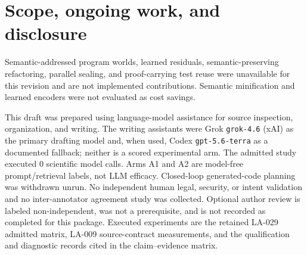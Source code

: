 \documentclass{article}
\begin{document}
\section{Scope, ongoing work, and disclosure}

Semantic-addressed program worlds, learned residuals, semantic-preserving refactoring, parallel sealing, and proof-carrying test reuse were unavailable for this revision and are not implemented contributions. Semantic minification and learned encoders were not evaluated as cost savings.

This draft was prepared using language-model assistance for source inspection, organization, and writing. The writing assistants were Grok \texttt{grok-4.6} (xAI) as the primary drafting model and, when used, Codex \texttt{gpt-5.6-terra} as a documented fallback; neither is a scored experimental arm. The admitted study executed $0$ scientific model calls. Arms A1 and A2 are model-free prompt/retrieval labels, not LLM efficacy. Closed-loop generated-code planning was withdrawn unrun. No independent human legal, security, or intent validation and no inter-annotator agreement study was collected. Optional author review is labeled non-independent, was not a prerequisite, and is not recorded as completed for this package. Executed experiments are the retained LA-029 admitted matrix, LA-009 source-contract measurements, and the qualification and diagnostic records cited in the claim--evidence matrix.

\clearpage

\end{document}
